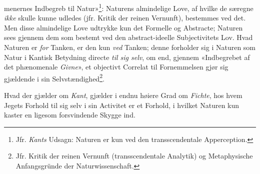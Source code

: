 menernes Indbegreb til Natur»\footnote{Jfr. \emph{Kants} Udsagn: Naturen er kun ved den transscendentale Apperception.}: Naturens almindelige Love,
af hvilke de særegne \emph{ikke} skulle kunne udledes (jfr. Kritik der
reinen Vernunft), bestemmes ved det. Men disse almindelige
Love udtrykke kun det Formelle og Abstracte; Naturen sees
gjennem dem som bestemt ved den abstract-ideelle Subjectivitets
Lov. Hvad Naturen er \emph{for} Tanken, er den kun \emph{ved}
Tanken; denne forholder sig i Naturen som Natur i Kantisk
Betydning directe \emph{til sig selv}, om end, gjennem «Indbegrebet
af det phænomenale \emph{Givne}», et objectivt Correlat til Fornemmelsen
gjør sig gjældende i sin Selvstændighed\footnote{Jfr. Kritik der reinen Vernunft (transscendentale Analytik) og Metaphysische Anfangsgründe der Naturwissenschaft.}.

Hvad der gjælder om \emph{Kant}, gjælder i endnu høiere Grad
om \emph{Fichte}, hos hvem Jegets Forhold til sig selv i sin Activitet
er et Forhold, i hvilket Naturen kun kaster en ligesom
forsvindende Skygge ind.

